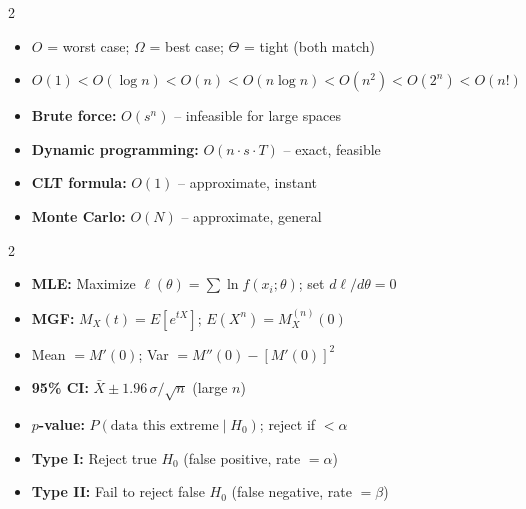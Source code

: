 \documentclass[11pt, letterpaper]{article}
\begin{document}
\vspace{4pt}

\begin{tcolorbox}[colback=part4bg, colframe=sectionorange,
  title={\bfseries Algorithmic Complexity \& Simulation}, arc=3pt, boxrule=1pt]
\footnotesize
\begin{multicols}{2}
\begin{itemize}[noitemsep, leftmargin=*]
  \item $O$ = worst case; $\Omega$ = best case; $\Theta$ = tight (both match)
  \item $O(1) < O(\log n) < O(n) < O(n\log n) < O(n^2) < O(2^n) < O(n!)$
\end{itemize}
\columnbreak
\begin{itemize}[noitemsep, leftmargin=*]
  \item \textbf{Brute force:} $O(s^n)$ -- infeasible for large spaces
  \item \textbf{Dynamic programming:} $O(n \cdot s \cdot T)$ -- exact, feasible
  \item \textbf{CLT formula:} $O(1)$ -- approximate, instant
  \item \textbf{Monte Carlo:} $O(N)$ -- approximate, general
\end{itemize}
\end{multicols}
\end{tcolorbox}

\vspace{4pt}

\begin{tcolorbox}[colback=part5bg, colframe=sectionteal,
  title={\bfseries MLE, MGFs, CIs \& Hypothesis Testing}, arc=3pt, boxrule=1pt]
\footnotesize
\begin{multicols}{2}
\begin{itemize}[noitemsep, leftmargin=*]
  \item \textbf{MLE:} Maximize $\ell(\theta) = \sum\ln f(x_i;\theta)$; set $d\ell/d\theta = 0$
  \item \textbf{MGF:} $M_X(t)=E[e^{tX}]$; $E(X^n) = M_X^{(n)}(0)$
  \item Mean $= M'(0)$; Var $= M''(0) - [M'(0)]^2$
\end{itemize}
\columnbreak
\begin{itemize}[noitemsep, leftmargin=*]
  \item \textbf{95\% CI:} $\bar{X} \pm 1.96\,\sigma/\sqrt{n}$ (large $n$)
  \item \textbf{$p$-value:} $P(\text{data this extreme} \mid H_0)$; reject if $< \alpha$
  \item \textbf{Type I:} Reject true $H_0$ (false positive, rate $= \alpha$)
  \item \textbf{Type II:} Fail to reject false $H_0$ (false negative, rate $= \beta$)
\end{itemize}
\end{multicols}
\end{tcolorbox}
\end{document}
